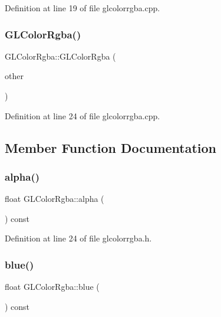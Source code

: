 Definition at line 19 of file glcolorrgba.\+cpp.

\mbox{\label{class_g_l_color_rgba_a6ffc715b25827505384d7309235baacf}} 
\subsubsection{\texorpdfstring{GLColorRgba()}{GLColorRgba()}\hspace{0.1cm}{\footnotesize\ttfamily [3/3]}}
{\footnotesize\ttfamily G\+L\+Color\+Rgba\+::\+G\+L\+Color\+Rgba (\begin{DoxyParamCaption}\item[{const Q\+Vector4D \&}]{other }\end{DoxyParamCaption})}



Definition at line 24 of file glcolorrgba.\+cpp.



\subsection{Member Function Documentation}
\mbox{\label{class_g_l_color_rgba_a66d6b14dc626a277e9848fc16230e9c7}} 
\subsubsection{\texorpdfstring{alpha()}{alpha()}}
{\footnotesize\ttfamily float G\+L\+Color\+Rgba\+::alpha (\begin{DoxyParamCaption}{ }\end{DoxyParamCaption}) const\hspace{0.3cm}{\ttfamily [inline]}}



Definition at line 24 of file glcolorrgba.\+h.

\mbox{\label{class_g_l_color_rgba_ab7c2621addaa72a585ad4882a70780d6}} 
\subsubsection{\texorpdfstring{blue()}{blue()}}
{\footnotesize\ttfamily float G\+L\+Color\+Rgba\+::blue (\begin{DoxyParamCaption}{ }\end{DoxyParamCaption}) const\hspace{0.3cm}{\ttfamily [inline]}}



